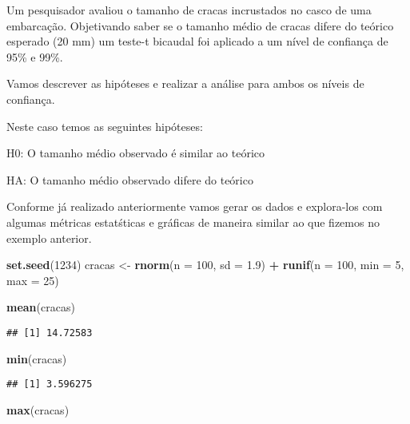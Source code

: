\documentclass[14pt,titlepage, oneside, openany, a4paper]{book}
\newenvironment{Shaded}{\begin{snugshade}}{\end{snugshade}}
\newcommand{\DataTypeTok}[1]{\textcolor[rgb]{0.13,0.29,0.53}{#1}}
\newcommand{\DecValTok}[1]{\textcolor[rgb]{0.00,0.00,0.81}{#1}}
\newcommand{\FloatTok}[1]{\textcolor[rgb]{0.00,0.00,0.81}{#1}}
\newcommand{\KeywordTok}[1]{\textcolor[rgb]{0.13,0.29,0.53}{\textbf{#1}}}
\newcommand{\NormalTok}[1]{#1}
\newcommand{\OperatorTok}[1]{\textcolor[rgb]{0.81,0.36,0.00}{\textbf{#1}}}
\newcommand{\StringTok}[1]{\textcolor[rgb]{0.31,0.60,0.02}{#1}}
\begin{document}
Um pesquisador avaliou o tamanho de cracas incrustados no casco de uma embarcação. Objetivando saber se o tamanho médio de cracas difere do teórico esperado (20 mm) um teste-t bicaudal foi aplicado a um nível de confiança de 95\% e 99\%.

Vamos descrever as hipóteses e realizar a análise para ambos os níveis de confiança.

Neste caso temos as seguintes hipóteses:

H0: O tamanho médio observado é similar ao teórico

HA: O tamanho médio observado difere do teórico

Conforme já realizado anteriormente vamos gerar os dados e explora-los com algumas métricas estatśticas e gráficas de maneira similar ao que fizemos no exemplo anterior.

\begin{Shaded}
\begin{Highlighting}[]
\KeywordTok{set.seed}\NormalTok{(}\DecValTok{1234}\NormalTok{)}
\NormalTok{cracas <-}\StringTok{ }\KeywordTok{rnorm}\NormalTok{(}\DataTypeTok{n =} \DecValTok{100}\NormalTok{, }\DataTypeTok{sd =} \FloatTok{1.9}\NormalTok{) }\OperatorTok{+}\StringTok{ }\KeywordTok{runif}\NormalTok{(}\DataTypeTok{n =} \DecValTok{100}\NormalTok{, }\DataTypeTok{min =} \DecValTok{5}\NormalTok{, }\DataTypeTok{max =} \DecValTok{25}\NormalTok{)}

\KeywordTok{mean}\NormalTok{(cracas)}
\end{Highlighting}
\end{Shaded}

\begin{verbatim}
## [1] 14.72583
\end{verbatim}

\begin{Shaded}
\begin{Highlighting}[]
\KeywordTok{min}\NormalTok{(cracas)}
\end{Highlighting}
\end{Shaded}

\begin{verbatim}
## [1] 3.596275
\end{verbatim}

\begin{Shaded}
\begin{Highlighting}[]
\KeywordTok{max}\NormalTok{(cracas)}
\end{Highlighting}
\end{Shaded}
\end{document}
